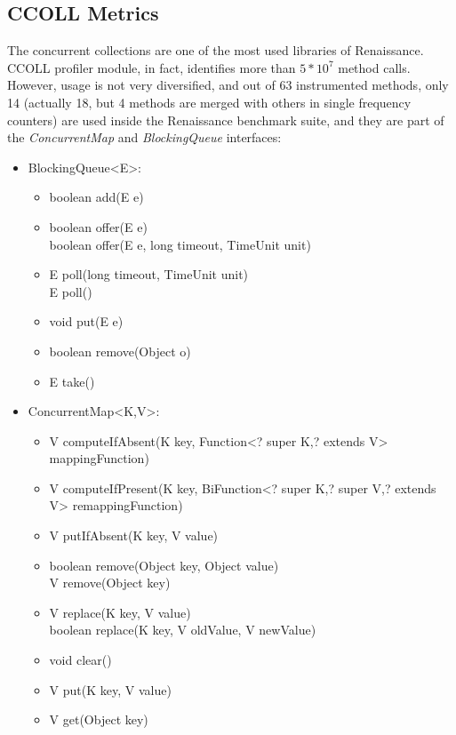 \documentclass[]{usiinfthesis}
\begin{document}
\subsection{CCOLL Metrics}
The concurrent collections are one of the most used libraries of Renaissance. CCOLL profiler module, in fact, identifies more than \(5*10^7\) method calls. However, usage is not very diversified, and out of 63 instrumented methods, only 14 (actually 18, but 4 methods are merged with others in single frequency counters) are used inside the Renaissance benchmark suite, and they are part of the \textit{ConcurrentMap} and \textit{BlockingQueue} interfaces:
\begin{itemize}
    \item BlockingQueue<E>:
    \begin{itemize}
        \item boolean add(E e)
        \item boolean offer(E e)
        \mbox{}\\ boolean offer(E e, long timeout, TimeUnit unit)
        \item E poll(long timeout, TimeUnit unit)
        \mbox{}\\ E poll()
        \item void put(E e)
        \item boolean remove(Object o)
        \item E take()
    \end{itemize}
    \item ConcurrentMap<K,V>:
    \begin{itemize}    
    \item   V computeIfAbsent(K key, Function<? super K,? extends V> mappingFunction)
    \item   V computeIfPresent(K key, BiFunction<? super K,? super V,? extends V> remappingFunction)
    \item   V putIfAbsent(K key, V value)
    \item   boolean remove(Object key, Object value)
    \mbox{}\\      V remove(Object key)
    \item   V replace(K key, V value)
    \mbox{}\\      boolean replace(K key, V oldValue, V newValue)
    \item   void clear()
    \item   V put(K key, V value)
    \item   V get(Object key)
    \end{itemize}
\end{itemize}
\end{document}

